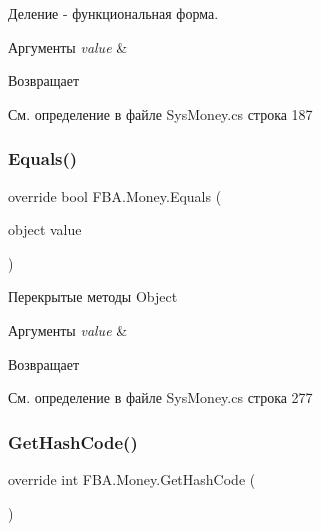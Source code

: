 Деление -\/ функциональная форма. 


\begin{DoxyParams}{Аргументы}
{\em value} & \\
\hline
\end{DoxyParams}
\begin{DoxyReturn}{Возвращает}

\end{DoxyReturn}


См. определение в файле Sys\+Money.\+cs строка 187

\mbox{\label{struct_f_b_a_1_1_money_a4bbc7b4bae072442b208b68fb035d5fd}} 
\subsubsection{\texorpdfstring{Equals()}{Equals()}}
{\footnotesize\ttfamily override bool F\+B\+A.\+Money.\+Equals (\begin{DoxyParamCaption}\item[{object}]{value }\end{DoxyParamCaption})}



Перекрытые методы Object 


\begin{DoxyParams}{Аргументы}
{\em value} & \\
\hline
\end{DoxyParams}
\begin{DoxyReturn}{Возвращает}

\end{DoxyReturn}


См. определение в файле Sys\+Money.\+cs строка 277

\mbox{\label{struct_f_b_a_1_1_money_af2d64ddd64795af6f7730ad20258d54a}} 
\subsubsection{\texorpdfstring{Get\+Hash\+Code()}{GetHashCode()}}
{\footnotesize\ttfamily override int F\+B\+A.\+Money.\+Get\+Hash\+Code (\begin{DoxyParamCaption}{ }\end{DoxyParamCaption})}



